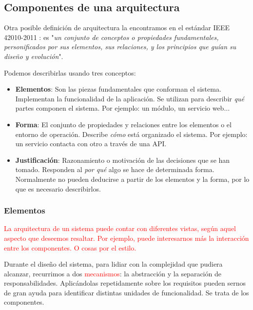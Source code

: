 \subsection{Componentes de una arquitectura}

Otra posible definición de arquitectura la encontramos en el estándar IEEE 42010-2011 \cite{ieeeStandard420102011Systems2011}: es "\textit{un conjunto de conceptos o propiedades fundamentales, personificados por sus elementos, sus relaciones, y los principios que guían su diseño y evolución}".

Podemos describirlas usando tres conceptos: \cite{perryFoundationsStudySoftware1992}

    \begin{itemize}
        \item \textbf{Elementos}: Son las piezas fundamentales que conforman el sistema. Implementan la funcionalidad de la aplicación. Se utilizan para describir \textit{qué} partes componen el sistema. Por ejemplo: un módulo, un servicio web...

        \item \textbf{Forma}: El conjunto de propiedades y relaciones entre los elementos o el entorno de operación. Describe \textit{cómo} está organizado el sistema. Por ejemplo: un servicio contacta con otro a través de una API.

        \item \textbf{Justificación}: Razonamiento o motivación de las decisiones que se han tomado. Responden al \textit{por qué} algo se hace de determinada forma. Normalmente no pueden deducirse a partir de los elementos y la forma, por lo que es necesario describirlos.

    \end{itemize}

\subsubsection{Elementos}

\textcolor{red}{La arquitectura de un sistema puede contar con diferentes vistas, según aquel aspecto que deseemos resaltar. Por ejemplo, puede interesarnos más la interacción entre los componentes. O cosas por el estilo.}

Durante el diseño del sistema, para lidiar con la complejidad que pudiera alcanzar, recurrimos a dos \textcolor{red}{mecanismos}: la abstracción y la separación de responsabilidades. \cite{martinCleanArchitectureCraftsman2018} Aplicándolas repetidamente sobre los requisitos pueden sernos de gran ayuda para identificar distintas unidades de funcionalidad. Se trata de los componentes.

